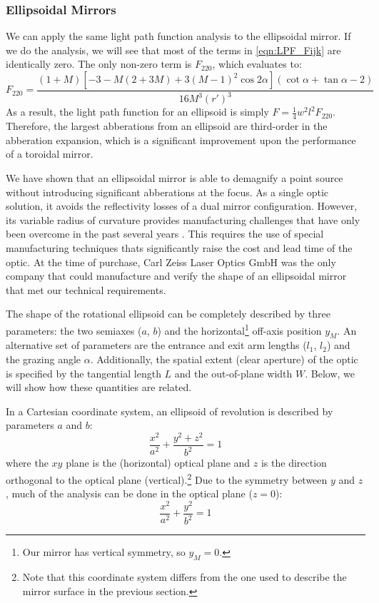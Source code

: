 \subsubsection{Ellipsoidal Mirrors}

We can apply the same light path function analysis to the ellipsoidal mirror. If we do the analysis, we will see that most of the terms in \cref{eqn:LPF_Fijk} are identically zero. The only non-zero term is $F_{220}$, which evaluates to:
\begin{equation}
F_{220} = \frac{(1+M) \left[-3-M(2+3M)+3(M-1)^2 \cos 2 \alpha \right] (\cot \alpha + \tan \alpha -2)}{16 M^3 (r')^3}
\end{equation}
As a result, the light path function for an ellipsoid is simply $F = \frac{1}{4} w^2 l^2 F_{220}$. Therefore, the largest abberations from an ellipsoid are third-order in the abberation expansion, which is a significant improvement upon the performance of a toroidal mirror.

We have shown that an ellipsoidal mirror is able to demagnify a point source without introducing significant abberations at the focus. As a single optic solution, it avoids the reflectivity losses of a dual mirror configuration. However, its variable radius of curvature provides manufacturing challenges that have only been overcome in the past several years \cite{motoyamaErrorAnalysisEllipsoidal2014}. This requires the use of special manufacturing techniques thats significantly raise the cost and lead time of the optic. At the time of purchase, Carl Zeiss Laser Optics GmbH was the only company that could manufacture and verify the shape of an ellipsoidal mirror that met our technical requirements.

The shape of the rotational ellipsoid can be completely described by three parameters: the two semiaxes ($a$, $b$) and the horizontal\footnote{Our mirror has vertical symmetry, so $y_M=0$.} off-axis position $y_M$. An alternative set of parameters are the entrance and exit arm lengths ($l_1$, $l_2$) and the grazing angle $\alpha$. Additionally, the spatial extent (clear aperture) of the optic is specified by the tangential length $L$ and the out-of-plane width $W$. Below, we will show how these quantities are related.

In a Cartesian coordinate system, an ellipsoid of revolution is described by parameters $a$ and $b$:
\begin{equation}
\frac{x^2}{a^2} + \frac{y^2 + z^2}{b^2} = 1
\end{equation}
where the $xy$ plane is the (horizontal) optical plane and $z$ is the direction orthogonal to the optical plane (vertical).\footnote{Note that this coordinate system differs from the one used to describe the mirror surface in the previous section.} Due to the symmetry between $y$ and $z$, much of the analysis can be done in the optical plane ($z=0$):
\begin{equation}
\frac{x^2}{a^2} + \frac{y^2}{b^2} = 1
\label{eqn:ellipse}
\end{equation}

